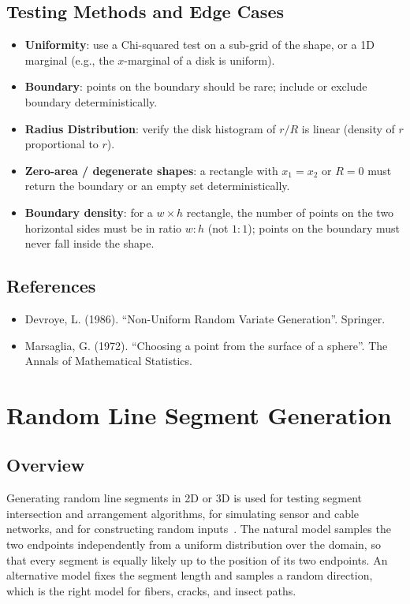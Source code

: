 \subsection{Testing Methods and Edge Cases}
\begin{itemize}
    \item \textbf{Uniformity}: use a Chi-squared test on a sub-grid of the
      shape, or a 1D marginal (e.g., the $x$-marginal of a disk is uniform).
    \item \textbf{Boundary}: points on the boundary should be rare; include or
      exclude boundary deterministically.
    \item \textbf{Radius Distribution}: verify the disk histogram of $r / R$
      is linear (density of $r$ proportional to $r$).
    \item \textbf{Zero-area / degenerate shapes}: a rectangle with
      $x_1 = x_2$ or $R = 0$ must return the boundary or an empty set
      deterministically.
    \item \textbf{Boundary density}: for a $w \times h$ rectangle, the number
      of points on the two horizontal sides must be in ratio $w : h$ (not
      $1 : 1$); points on the boundary must never fall inside the shape.
\end{itemize}

\subsection{References}
\begin{itemize}
    \item Devroye, L. (1986). ``Non-Uniform Random Variate Generation''.
      Springer.
    \item Marsaglia, G. (1972). ``Choosing a point from the surface of a
      sphere''. The Annals of Mathematical Statistics.
\end{itemize}

\section{Random Line Segment Generation}
\label{sec:random_segments}

\subsection{Overview}
Generating random line segments in 2D or 3D
is used for testing segment intersection and arrangement algorithms, for
simulating sensor and cable networks, and for constructing random
inputs~\cite{deberg2008}. The natural model samples the two endpoints
independently from a uniform distribution over the domain, so that every
segment is equally likely up to the position of its two endpoints. An
alternative model fixes the segment length and samples a random direction,
which is the right model for fibers, cracks, and insect paths.


